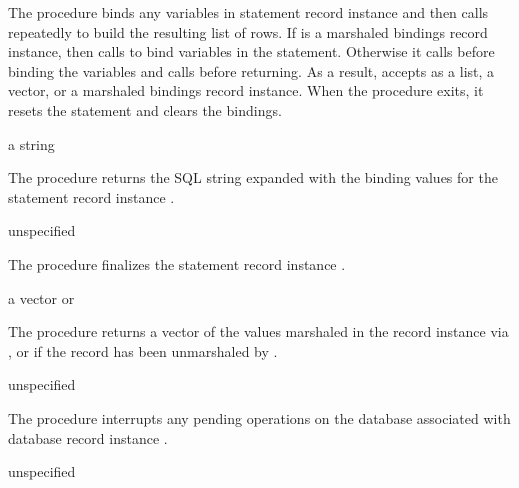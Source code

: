 The  procedure binds any variables in statement
record instance  and then calls  repeatedly to build the resulting list of rows.
If  is a marshaled bindings record instance,
then  calls 
to bind variables in the statement.
Otherwise it calls 
before binding the variables and calls 
before returning.
As a result,  accepts as  a list,
a vector, or a marshaled bindings record instance.
When the procedure exits, it resets the statement and clears the bindings.

\begin{procedure}
\end{procedure}
\returns{} a string

The  procedure returns the SQL string
expanded with the binding values for the statement record instance
.

\begin{procedure}
\end{procedure}
\returns{} unspecified

The  procedure finalizes the statement record
instance .

\begin{procedure}
\end{procedure}
\returns{} a vector or 

The  procedure returns a vector of the values
marshaled in the  record instance via ,
or  if the record has been unmarshaled by
.

\begin{procedure}
\end{procedure}
\returns{} unspecified

The  procedure interrupts any pending
operations on the database associated with database record instance
.

\begin{procedure}
\end{procedure}
\returns{} unspecified


